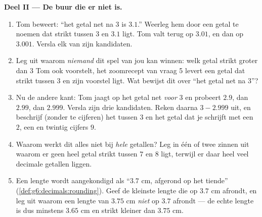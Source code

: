 \begin{problem}
\medskip
\noindent\textbf{Deel II --- De buur die er niet is.}
\begin{enumerate}[resume]
  \item Tom beweert: ``het getal net na $3$ is $3.1$.'' Weerleg hem door een
        getal te noemen dat strikt tussen $3$ en $3.1$ ligt. Tom valt terug
        op $3.01$, en dan op $3.001$. Versla elk van zijn kandidaten.
  \item Leg uit waarom \emph{niemand} dit spel van jou kan winnen: welk getal
        strikt groter dan $3$ Tom ook voorstelt, het zoomrecept van vraag 5
        levert een getal dat strikt tussen $3$ en zijn voorstel ligt. Wat
        bewijst dit over ``het getal net na $3$''?
  \item Nu de andere kant: Tom jaagt op het getal net \emph{voor} $3$ en
        probeert $2.9$, dan $2.99$, dan $2.999$. Versla zijn drie kandidaten.
        Reken daarna $3 - 2.999$ uit, en beschrijf (zonder te cijferen) het
         tussen $3$ en het getal dat je schrijft met een $2$, een
         en twintig cijfers $9$.
  \item Waarom werkt dit alles niet bij \emph{hele} getallen? Leg in één of
        twee zinnen uit waarom er geen heel getal strikt tussen $7$ en $8$
        ligt, terwijl er daar heel veel decimale getallen liggen.
  \item Een lengte wordt aangekondigd als ``$3.7$ cm, afgerond op het
        tiende'' (\cref{def:g6:decimals:rounding}). Geef de kleinste lengte
        die op $3.7$ cm afrondt, en leg uit waarom een lengte van $3.75$ cm
        \emph{niet} op $3.7$ afrondt --- de echte lengte is dus minstens
        $3.65$ cm en strikt kleiner dan $3.75$ cm.
\end{enumerate}


\end{problem}
